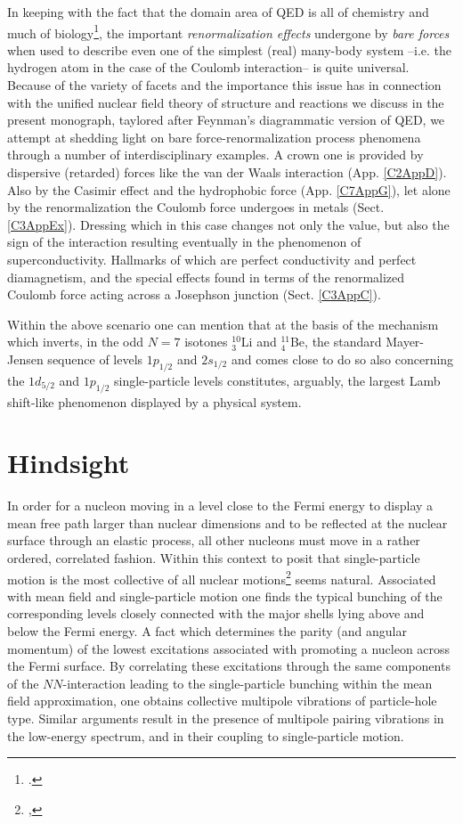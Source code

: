 In keeping with the fact that the domain area of QED is all of chemistry and much of biology\footnote{\cite{Feynman:06}.}, the important \textit{renormalization effects} undergone by \textit{bare forces} when used to describe even one of the simplest (real) many-body system --i.e. the hydrogen atom in the case of the Coulomb interaction-- is quite universal. Because of the variety of facets and the importance this issue has in connection with the unified nuclear field theory of structure and reactions we discuss in the present monograph, taylored after Feynman's diagrammatic version of QED, we attempt at shedding light on bare force-renormalization process phenomena through a number of interdisciplinary examples. A crown one is provided by dispersive (retarded) forces like the van der Waals interaction (App. \ref{C2AppD}). Also by the Casimir effect and the hydrophobic force (App. \ref{C7AppG}), let alone by the renormalization the Coulomb force undergoes in metals (Sect. \ref{C3AppEx}). Dressing which in this case changes not only the value, but also the sign of the interaction  resulting eventually in the phenomenon of superconductivity. Hallmarks of which are perfect conductivity and perfect diamagnetism, and the special effects found in terms of the renormalized Coulomb force acting across a Josephson junction (Sect. \ref{C3AppC}). 


Within the above scenario one can mention that at the basis of the mechanism which inverts, in the odd $N=7$ isotones $^{10}_3$Li and $^{11}_4$Be, the standard Mayer-Jensen sequence of levels $1p_{1/2}$ and $2s_{1/2}$ and comes close to do so also concerning the $1d_{5/2}$ and $1p_{1/2}$ single-particle levels constitutes, arguably, the largest Lamb shift-like phenomenon displayed by a physical system.
\section{Hindsight}\label{Sect1.10}
In order for a nucleon moving in a level close to the Fermi energy to display a mean free path larger than nuclear dimensions and to be reflected at the nuclear surface through an elastic process, all other nucleons must move in a rather ordered, correlated fashion. Within this context to posit that single-particle motion is the most collective of all nuclear motions\footnote{\cite{Mottelson:62},} seems natural. Associated with mean field and single-particle motion one finds the typical bunching of the corresponding levels closely connected with the major shells lying above and below the Fermi energy. A fact which determines the parity (and angular momentum) of the lowest excitations associated with promoting  a nucleon across the Fermi surface.  By correlating these excitations through the same components of the $NN$-interaction leading to the single-particle bunching within the mean field approximation, one obtains  collective multipole  vibrations of particle-hole type. Similar arguments result in the presence of multipole pairing vibrations in the low-energy spectrum, and in their coupling to single-particle motion.

